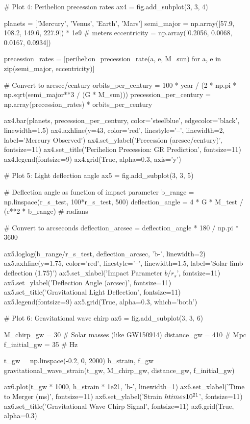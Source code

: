 \documentclass[a4paper, 11pt]{article}
\begin{document}
\begin{pycode}
# Plot 4: Perihelion precession rates
ax4 = fig.add_subplot(3, 3, 4)

planets = ['Mercury', 'Venus', 'Earth', 'Mars']
semi_major = np.array([57.9, 108.2, 149.6, 227.9]) * 1e9  # meters
eccentricity = np.array([0.2056, 0.0068, 0.0167, 0.0934])

precession_rates = [perihelion_precession_rate(a, e, M_sun)
                   for a, e in zip(semi_major, eccentricity)]

# Convert to arcsec/century
orbits_per_century = 100 * year / (2 * np.pi * np.sqrt(semi_major**3 / (G * M_sun)))
precession_per_century = np.array(precession_rates) * orbits_per_century

ax4.bar(planets, precession_per_century, color='steelblue', edgecolor='black', linewidth=1.5)
ax4.axhline(y=43, color='red', linestyle='--', linewidth=2, label='Mercury Observed')
ax4.set_ylabel('Precession (arcsec/century)', fontsize=11)
ax4.set_title('Perihelion Precession: GR Prediction', fontsize=11)
ax4.legend(fontsize=9)
ax4.grid(True, alpha=0.3, axis='y')

# Plot 5: Light deflection angle
ax5 = fig.add_subplot(3, 3, 5)

# Deflection angle as function of impact parameter
b_range = np.linspace(r_s_test, 100*r_s_test, 500)
deflection_angle = 4 * G * M_test / (c**2 * b_range)  # radians

# Convert to arcseconds
deflection_arcsec = deflection_angle * 180 / np.pi * 3600

ax5.loglog(b_range/r_s_test, deflection_arcsec, 'b-', linewidth=2)
ax5.axhline(y=1.75, color='red', linestyle='--', linewidth=1.5,
           label='Solar limb deflection (1.75\")')
ax5.set_xlabel('Impact Parameter $b/r_s$', fontsize=11)
ax5.set_ylabel('Deflection Angle (arcsec)', fontsize=11)
ax5.set_title('Gravitational Light Deflection', fontsize=11)
ax5.legend(fontsize=9)
ax5.grid(True, alpha=0.3, which='both')

# Plot 6: Gravitational wave chirp
ax6 = fig.add_subplot(3, 3, 6)

M_chirp_gw = 30  # Solar masses (like GW150914)
distance_gw = 410  # Mpc
f_initial_gw = 35  # Hz

t_gw = np.linspace(-0.2, 0, 2000)
h_strain, f_gw = gravitational_wave_strain(t_gw, M_chirp_gw, distance_gw, f_initial_gw)

ax6.plot(t_gw * 1000, h_strain * 1e21, 'b-', linewidth=1)
ax6.set_xlabel('Time to Merger (ms)', fontsize=11)
ax6.set_ylabel('Strain $h \\times 10^{21}$', fontsize=11)
ax6.set_title('Gravitational Wave Chirp Signal', fontsize=11)
ax6.grid(True, alpha=0.3)


\end{pycode}
\end{document}

